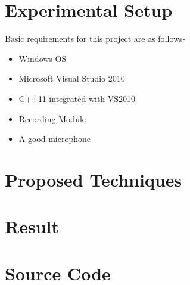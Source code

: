\documentclass{article}
\begin{document}
\section{Experimental Setup}
Basic requirements for this project are as follows-\\
\begin{itemize}
\item Windows OS
\item Microsoft Visual Studio 2010
\item C++11 integrated with VS2010
\item Recording Module
\item A good microphone
\end{itemize}
\section{Proposed Techniques}
\section{Result}
\section{Source Code}
\end{document}

